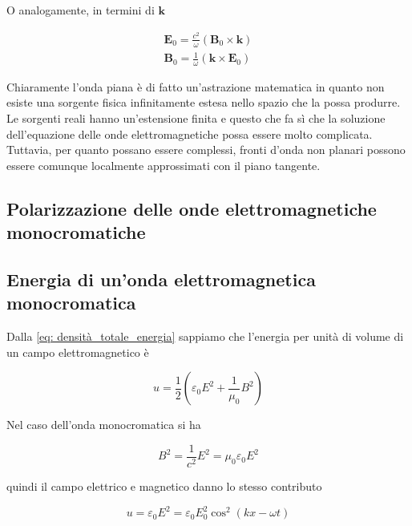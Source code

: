 O analogamente, in termini di $\mathbf{k}$

\begin{tcolorbox}[colback=yellow!10!white, colframe=orange!70!black, boxrule=0.8pt]
\begin{align}
    \mathbf{E}_0 = \frac{c^2}{\omega} (\mathbf{B}_0 \times \mathbf{k}) \\
    \mathbf{B}_0 = \frac{1}{\omega} (\mathbf{k} \times \mathbf{E}_0)
\end{align}
\end{tcolorbox}

Chiaramente l’onda piana è di fatto un’astrazione matematica in quanto non esiste una sorgente fisica infinitamente estesa nello spazio che la possa produrre. Le sorgenti reali hanno un’estensione finita e questo che fa sì che la soluzione dell’equazione delle onde elettromagnetiche possa essere molto complicata.
Tuttavia, per quanto possano essere complessi, fronti d’onda non planari possono essere comunque localmente approssimati con il piano tangente.

\subsection{Polarizzazione delle onde elettromagnetiche monocromatiche}

\newpage

\subsection{Energia di un'onda elettromagnetica monocromatica}

Dalla \ref{eq: densità_totale_energia} sappiamo che l'energia per unità di volume di un campo elettromagnetico è 

\begin{equation}
    u = \frac{1}{2} \left(\varepsilon_0 E^2 + \frac{1}{\mu_0}B^2\right)
\end{equation}

Nel caso dell'onda monocromatica si ha 

\begin{equation}
    B^2 = \frac{1}{c^2} E^2 = \mu_0 \varepsilon_0 E^2
\end{equation}

quindi il campo elettrico e magnetico danno lo stesso contributo

\begin{tcolorbox}[colback=yellow!10!white, colframe=orange!70!black, boxrule=0.8pt]
\begin{equation}
    u = \varepsilon_0 E^2 = \varepsilon_0 E_0^2 \cos^2(kx - \omega t)
\end{equation}
\end{tcolorbox}

